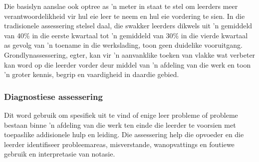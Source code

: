 Die basislyn aanslae ook optree as 'n meter in staat te stel om leerders meer verantwoordelikheid vir hul eie leer te neem en hul eie vordering te sien. In die tradisionele assessering stelsel daal, die swakker leerders dikwels uit 'n gemiddeld van 40\% in die eerste kwartaal tot 'n gemiddeld van 30\% in die vierde kwartaal as gevolg van 'n toename in die werkslading, toon geen duidelike vooruitgang. Grondlynassessering, egter, kan vir 'n aanvanklike toeken van vlakke wat verbeter kan word op die leerder vorder deur middel van 'n afdeling van die werk en toon 'n groter kennis, begrip en vaardigheid in daardie gebied.

\subsubsection{Diagnostiese assessering}
Dit word gebruik om spesifiek uit te vind of enige leer probleme of probleme bestaan ​​binne 'n afdeling van die werk ten einde die leerder te voorsien met toepaslike addisionele hulp en leiding. Die assessering help die opvoeder en die leerder identifiseer probleemareas, misverstande, wanopvattings en foutiewe gebruik en interpretasie van notasie.

